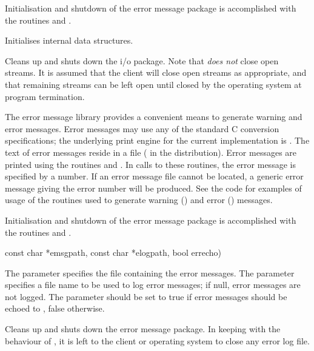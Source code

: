 Initialisation and shutdown of the error message package is accomplished with
the routines  and .
\begin{subrdoc}
  \item

  Initialises internal data structures.

  \item

  Cleans up and shuts down the i/o package.
  Note that  \textit{does not} close open streams.
  It is assumed that the client will close open streams as appropriate, and
  that remaining streams can be left open until closed by the operating system
  at program termination.
\end{subrdoc}


The error message library provides a convenient means to generate warning and
error messages.
Error messages may use any of the standard C conversion specifications; the
underlying print engine for the current implementation is .
The text of error messages reside in a file
( in the \dylp distribution).
Error messages are printed using the routines  and .
In calls to these routines, the error message is specified by a number.
If an error message file cannot be located, a generic error message giving the
error number will be produced.
See the code for examples of usage of the routines used to generate
warning () and error () messages.

Initialisation and shutdown of the error message package is accomplished with
the routines  and .
\begin{subrdoc}
  \item
	  {const char *emsgpath, const char *elogpath, bool errecho)}

  The parameter  specifies the file containing the error
  messages.
  The parameter  specifies a file name to be used to log
  error messages; if null, error messages are not logged.
  The parameter  should be set to true if error messages
  should be echoed to , false otherwise.

  \item

  Cleans up and shuts down the error message package.
  In keeping with the behaviour of , it is left to the
  client or operating system to close any error log file.
\end{subrdoc}

